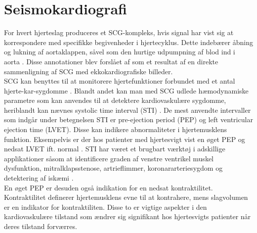 \section{Seismokardiografi}
For hvert hjerteslag produceres et SCG-kompleks, hvis signal har vist sig at korrespondere med specifikke begivenheder i hjertecyklus. Dette indebærer åbning og lukning af aortaklappen, såvel som den hurtige udpumpning af blod ind i aorta \citep{inan2015}. Disse annotationer blev forslået af \citet{crow1994relationship} som et resultat af en direkte sammenligning af SCG med ekkokardiografiske billeder. \\

SCG kan benyttes til at monitorere hjertefunktioner forbundet med et antal hjerte-kar-sygdomme \citep{munir2008}. Blandt andet kan man med SCG udlede hæmodynamiske parametre som kan anvendes til at detektere kardiovaskulære sygdomme, heriblandt kan nævnes systolic time interval (STI) \citep{di2013wearable}. De mest anvendte intervaller som indgår under betegnelsen STI er pre-ejection period (PEP) og left ventricular ejection time (LVET). Disse kan indikere abnormaliteter i hjertemusklens funktion. \citep{Reant2010} Eksempelvis er der hos patienter med hjertesvigt vist en øget PEP og nedsat LVET ift. normal \citep{Marcus2007}.  STI har været et brugbart værktøj i adskillige applikationer såsom at identificere graden af venstre ventrikel muskel dysfunktion, mitralklapsstenose, artrieflimmer, koronararteriesygdom og detektering af iskæmi \citep{Shafiq2016}. \\
En øget PEP er desuden også indikation for en nedsat kontraktilitet. Kontraktilitet definerer hjertemusklens evne til at kontrahere, mens slagvolumen er en indikator for kontraktiliten. Disse to er vigtige aspekter i den kardiovaskulære tilstand som ændrer sig signifikant hos hjertesvigts patienter når deres tilstand forværres. \citep{Ashouri2016}\\


